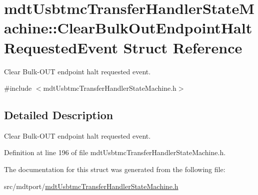 \hypertarget{structmdt_usbtmc_transfer_handler_state_machine_1_1_clear_bulk_out_endpoint_halt_requested_event}{\section{mdt\-Usbtmc\-Transfer\-Handler\-State\-Machine\-:\-:Clear\-Bulk\-Out\-Endpoint\-Halt\-Requested\-Event Struct Reference}
\label{structmdt_usbtmc_transfer_handler_state_machine_1_1_clear_bulk_out_endpoint_halt_requested_event}
}


Clear Bulk-\/\-O\-U\-T endpoint halt requested event.  




{\ttfamily \#include $<$mdt\-Usbtmc\-Transfer\-Handler\-State\-Machine.\-h$>$}



\subsection{Detailed Description}
Clear Bulk-\/\-O\-U\-T endpoint halt requested event. 

Definition at line 196 of file mdt\-Usbtmc\-Transfer\-Handler\-State\-Machine.\-h.



The documentation for this struct was generated from the following file\-:\begin{DoxyCompactItemize}
\item 
src/mdtport/\hyperlink{mdt_usbtmc_transfer_handler_state_machine_8h}{mdt\-Usbtmc\-Transfer\-Handler\-State\-Machine.\-h}\end{DoxyCompactItemize}
